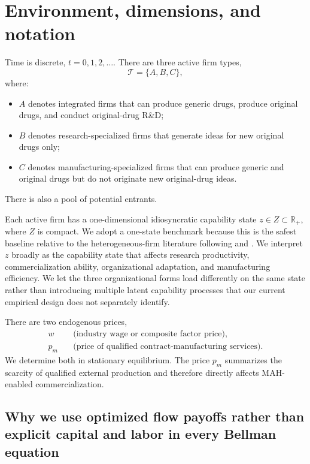\documentclass[12pt]{article}
\newcommand{\R}{\mathbb{R}}
\newcommand{\1}{\mathbf{1}}
\newcommand{\Tset}{\mathcal{T}}
\begin{document}
\section{Environment, dimensions, and notation}

Time is discrete, $t=0,1,2,\dots$. There are three active firm types,
\[
\Tset = \{A,B,C\},
\]
where:
\begin{itemize}[leftmargin=2em]
    \item $A$ denotes integrated firms that can produce generic drugs, produce original drugs, and conduct original-drug R\&D;
    \item $B$ denotes research-specialized firms that generate ideas for new original drugs only;
    \item $C$ denotes manufacturing-specialized firms that can produce generic and original drugs but do not originate new original-drug ideas.
\end{itemize}
There is also a pool of potential entrants.

Each active firm has a one-dimensional idiosyncratic capability state $z\in Z\subset\R_+$, where $Z$ is compact. We adopt a one-state benchmark because this is the safest baseline relative to the heterogeneous-firm literature following \citet{Hopenhayn1992} and \citet{Jovanovic1982}. We interpret $z$ broadly as the capability state that affects research productivity, commercialization ability, organizational adaptation, and manufacturing efficiency. We let the three organizational forms load differently on the same state rather than introducing multiple latent capability processes that our current empirical design does not separately identify.

There are two endogenous prices,
\[
\begin{aligned}
w &\quad \text{(industry wage or composite factor price)},\\
p_m &\quad \text{(price of qualified contract-manufacturing services)}.
\end{aligned}
\]
We determine both in stationary equilibrium. The price $p_m$ summarizes the scarcity of qualified external production and therefore directly affects MAH-enabled commercialization.

\subsection{Why we use optimized flow payoffs rather than explicit capital and labor in every Bellman equation}
\end{document}
